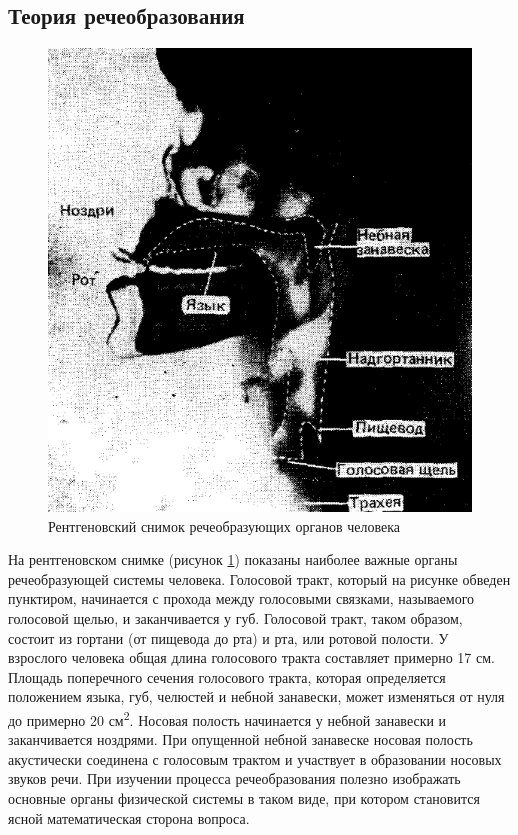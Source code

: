 \documentclass[a4paper,14pt,russian,utf8,nocolumnsxix,nocolumnxxxi,nocolumnxxxii]{eskdtext}
\begin{document}
\subsection {Теория речеобразования}
\begin{figure}[ht]
	\centering
	\includegraphics[width=120mm]{xray.jpg}			
	\caption{Рентгеновский снимок речеобразующих органов человека}
	\label{xray}
\end{figure}
На рентгеновском снимке (рисунок \ref{xray}) показаны наиболее важные органы речеобразующей системы человека. Голосовой тракт, который на рисунке обведен пунктиром, начинается с прохода между голосовыми связками, называемого голосовой щелью, и заканчивается у губ. Голосовой тракт, таком образом, состоит из гортани (от пищевода до рта) и рта, или ротовой полости. У взрослого человека общая длина голосового тракта составляет примерно 17 см. Площадь поперечного сечения голосового тракта, которая определяется положением языка, губ, челюстей и небной занавески, может изменяться от нуля до примерно 20 см\textsuperscript{2}. Носовая полость начинается у небной занавески и заканчивается ноздрями. При опущенной небной занавеске носовая полость акустически соединена с голосовым трактом и участвует в образовании носовых звуков речи. При изучении процесса речеобразования полезно изображать основные органы физической системы в таком виде, при котором становится ясной математическая сторона вопроса.
\end{document}
